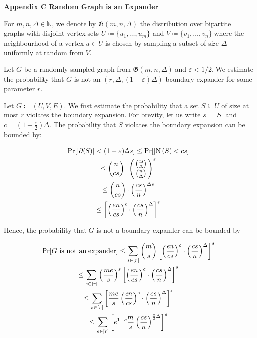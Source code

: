 \par\medskip\noindent\textbf{
Appendix C Random Graph is an Expander}\par




For $m,n,\Delta\in\mathbb{N}$, we denote by $\mathfrak{G}(m,n,\Delta)$ the distribution over
bipartite graphs with disjoint vertex sets $U\coloneqq\{u_{1},\dots,u_{m}\}$ and $V\coloneqq\{v_{1},\dots,v_{n}\}$ where the neighbourhood of a vertex $u\in U$ is chosen by sampling a subset of size
$\Delta$ uniformly at random from $V$.\par




Let $G$ be a randomly sampled graph from $\mathfrak{G}(m,n,\Delta)$ and $\varepsilon<1/2$. We
estimate the probability that $G$ is not an $(r,\Delta,(1-\varepsilon)\Delta)$-boundary expander
for some parameter $r$.\par




Let $G\coloneqq(U,V,E)$. We first estimate the probability that a set $S\subseteq U$ of size at most
$r$ violates the boundary expansion. For brevity, let us write $s=|S|$ and $c=(1-\frac{\varepsilon}{2})\Delta$. The probability that $S$ violates the boundary expansion can be bounded
by:\par


\[\begin{gathered}
\displaystyle\Pr[|\partial(S)|<(1-\varepsilon)\Delta s] \displaystyle\leq\Pr[|\mathrm{N}\left(S\right)<cs] \\
\displaystyle\leq\binom{n}{cs}\cdot\left(\frac{\binom{cs}{\Delta}}{\binom{n}{%
\Delta}}\right)^{s} \\
\displaystyle\leq\binom{n}{cs}\cdot\left(\frac{cs}{n}\right)^{\Delta s} \\
\displaystyle\leq\left[\left(\frac{en}{cs}\right)^{c}\cdot\left(\frac{cs}{n}%
\right)^{\Delta}\right]^{s}
\end{gathered}\]


Hence, the probability that $G$ is not a boundary expander can be bounded by\par


\[\begin{gathered}
\displaystyle\Pr[G\text{ is not an expander}] \displaystyle\leq\sum\limits_{s\in[r]}\binom{m}{s}\left[\left(\frac{en}{cs}%
\right)^{c}\cdot\left(\frac{cs}{n}\right)^{\Delta}\right]^{s} \\
\displaystyle\leq\sum\limits_{s\in[r]}\left(\frac{me}{s}\right)^{s}\left[\left%
(\frac{en}{cs}\right)^{c}\cdot\left(\frac{cs}{n}\right)^{\Delta}\right]^{s} \\
\displaystyle\leq\sum\limits_{s\in[r]}\left[\frac{me}{s}\left(\frac{en}{cs}%
\right)^{c}\cdot\left(\frac{cs}{n}\right)^{\Delta}\right]^{s} \\
\displaystyle\leq\sum\limits_{s\in[r]}\left[e^{1+c}\frac{m}{s}\left(\frac{cs}{%
n}\right)^{\frac{\varepsilon}{2}\Delta}\right]^{s}
\end{gathered}\]




